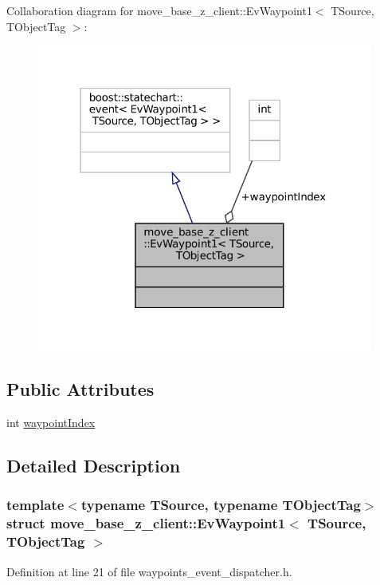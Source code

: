 Collaboration diagram for move\+\_\+base\+\_\+z\+\_\+client\+:\+:Ev\+Waypoint1$<$ T\+Source, T\+Object\+Tag $>$\+:
\nopagebreak
\begin{figure}[H]
\begin{center}
\leavevmode
\includegraphics[width=313pt]{structmove__base__z__client_1_1EvWaypoint1__coll__graph}
\end{center}
\end{figure}
\subsection*{Public Attributes}
\begin{DoxyCompactItemize}
\item 
int \hyperlink{structmove__base__z__client_1_1EvWaypoint1_a7313e1714012bad9c3da07660fe70b91}{waypoint\+Index}
\end{DoxyCompactItemize}


\subsection{Detailed Description}
\subsubsection*{template$<$typename T\+Source, typename T\+Object\+Tag$>$\newline
struct move\+\_\+base\+\_\+z\+\_\+client\+::\+Ev\+Waypoint1$<$ T\+Source, T\+Object\+Tag $>$}



Definition at line 21 of file waypoints\+\_\+event\+\_\+dispatcher.\+h.



